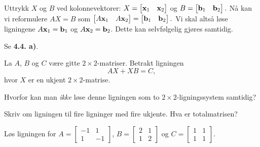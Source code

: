 \begin{losning}
\begin{punkt}
Uttrykk $X$ og $B$ ved kolonnevektorer: $X=\begin{bmatrix}
\mathbf{x}_1 & \mathbf{x}_2
\end{bmatrix}$ og $B=\begin{bmatrix}
\mathbf{b}_1 & \mathbf{b}_2
\end{bmatrix}.$ Nå kan vi reformulere $AX=B$ som $\begin{bmatrix}
A\mathbf{x}_1 & A\mathbf{x}_2
\end{bmatrix}=\begin{bmatrix}
\mathbf{b}_1 & \mathbf{b}_2
\end{bmatrix}.$ Vi skal altså løse ligningene $A\mathbf{x}_1=\mathbf{b}_1$ og $A\mathbf{x}_2=\mathbf{b}_2$. Dette kan selvfølgelig gjøres samtidig.
\end{punkt}

\begin{punkt}
Se \textbf{4.4. a)}.
\end{punkt}

\end{losning}

\begin{oppgave}
La $A$, $B$ og $C$ være gitte $2\times 2$-matriser. Betrakt ligningen $$AX+XB=C,$$ hvor $X$ er en ukjent $2\times 2$-matrise.

\begin{punkt}
Hvorfor kan man \emph{ikke} løse denne ligningen som to $2\times 2$-ligningssystem samtidig?
\end{punkt}

\begin{punkt}
Skriv om ligningen til fire ligninger med fire ukjente. Hva er totalmatrisen? 
\end{punkt}


\begin{punkt}
Løs ligningen for 
$A=\begin{bmatrix}
-1 & 1\\
1 & -1
\end{bmatrix}$, $B=\begin{bmatrix}
2 & 1\\
1 & 2
\end{bmatrix}$ og $C=\begin{bmatrix}
1 & 1\\
1 & 1
\end{bmatrix}.$
\end{punkt}

\end{oppgave}


